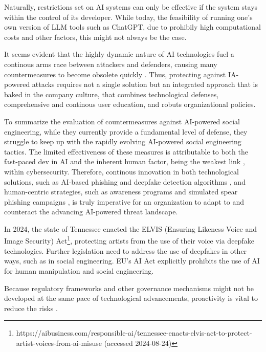 Naturally, restrictions set on AI systems can only be effective if the system stays within the control of its developer.  While today, the feasibility of running one's own version of LLM tools such as ChatGPT, due to prohibily high computational costs and other factors, this might not always be the case.

It seems evident that the highly dynamic nature of AI technologies fuel a continous arms race between attackers and defenders, causing many countermeasures to become obsolete quickly \citep{fakhouriAIDrivenSolutionsForSocialEngineeringAttacks2024}. Thus, protecting against IA-powered attacks requires not a single solution but an integrated approach that is baked in the company culture, that combines technological defenses, comprehensive and continous user education, and robuts organizational policies.

To summarize the evaluation of countermeasures against AI-powered social engineering, while they currently provide a fundamental level of defense, they struggle to keep up with the rapidly evolving AI-powered social engineering tactics. The limited effectiveness of these measures is attributable to both the fast-paced dev in AI and the inherent human factor, being the weakest link \citep{mitnick_The_Art_of_Deception_2003}, within cybersecurity. Therefore, continous innovation in both technological solutions, such as AI-based phishing and deepfake detection algorithms \citep{mirskyTheCreationAndDetectionOfDeepfakes2021}, and human-centric strategies, such as awareness programs and simulated spear phishing campaigns \citep{salahdineSocialEngineeringAttacks2019}, is truly imperative for an organization to adapt to and counteract the advancing AI-powered threat landscape.

In 2024, the state of Tennessee enacted the ELVIS (Ensuring Likeness Voice and Image Security) Act\footnote{https://aibusiness.com/responsible-ai/tennessee-enacts-elvis-act-to-protect-artist-voices-from-ai-misuse (accessed 2024-08-24)}, protecting artists from the use of their voice via deepfake technologies. Further legislation need to address the use of deepfakes in other ways, such as in social engineering. EU's AI Act explicitly prohibits the use of AI for human  manipulation and social engineering.

Because regulatory frameworks and other governance mechanisms might not be developed at the same pace of technological advancements, proactivity is vital to reduce the risks \citep{blauthArtificialIntelligenceCrimeOverviewMaliciousUseAbuse2022}.